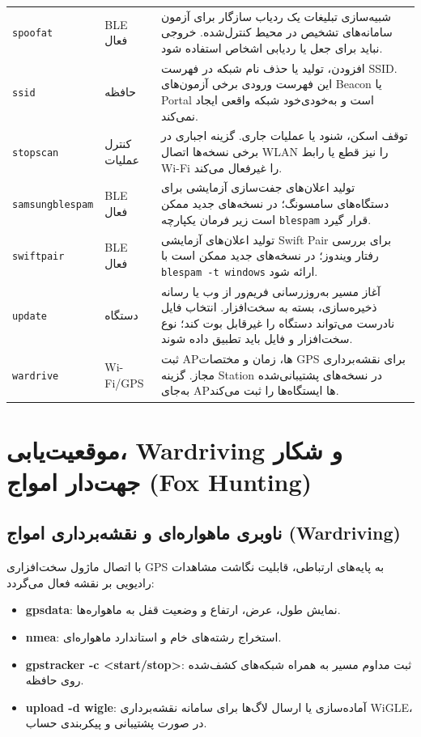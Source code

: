 \documentclass[11pt,a4paper]{article}
\newcommand{\lr}[1]{\foreignlanguage{english}{#1}}
\newcommand{\en}[1]{\lr{#1}}
\newcommand{\cmd}[1]{\lr{\nolinkurl{#1}}}
\begin{document}
\begin{longtable}{>{\raggedright\arraybackslash}p{3.4cm} >{\raggedleft\arraybackslash}p{3.2cm} >{\raggedleft\arraybackslash}p{8.7cm}}
\cmd{spoofat} & \en{BLE} فعال & شبیه‌سازی تبلیغات یک ردیاب سازگار برای آزمون سامانه‌های تشخیص در محیط کنترل‌شده. خروجی نباید برای جعل یا ردیابی اشخاص استفاده شود. \\
\cmd{ssid} & حافظه & افزودن، تولید یا حذف نام شبکه در فهرست SSID. این فهرست ورودی برخی آزمون‌های Beacon یا Portal است و به‌خودی‌خود شبکه واقعی ایجاد نمی‌کند. \\
\cmd{stopscan} & کنترل عملیات & توقف اسکن، شنود یا عملیات جاری. گزینه اجباری در برخی نسخه‌ها اتصال WLAN را نیز قطع یا رابط Wi-Fi را غیرفعال می‌کند. \\
\cmd{samsungblespam} & \en{BLE} فعال & تولید اعلان‌های جفت‌سازی آزمایشی برای دستگاه‌های سامسونگ؛ در نسخه‌های جدید ممکن است زیر فرمان یکپارچه \cmd{blespam} قرار گیرد. \\
\cmd{swiftpair} & \en{BLE} فعال & تولید اعلان‌های آزمایشی \en{Swift Pair} برای بررسی رفتار ویندوز؛ در نسخه‌های جدید ممکن است با \cmd{blespam -t windows} ارائه شود. \\
\cmd{update} & دستگاه & آغاز مسیر به‌روزرسانی فریم‌ور از وب یا رسانه ذخیره‌سازی، بسته به سخت‌افزار. انتخاب فایل نادرست می‌تواند دستگاه را غیرقابل بوت کند؛ نوع سخت‌افزار و فایل باید تطبیق داده شوند. \\
\cmd{wardrive} & \en{Wi-Fi/GPS} & ثبت APها، زمان و مختصات GPS برای نقشه‌برداری مجاز. گزینه Station در نسخه‌های پشتیبانی‌شده به‌جای APها ایستگاه‌ها را ثبت می‌کند. \\
\end{longtable}

\newpage
\section{موقعیت‌یابی، \en{Wardriving} و شکار جهت‌دار امواج \en{(Fox Hunting)}}

\subsection{ناوبری ماهواره‌ای و نقشه‌برداری امواج \en{(Wardriving)}}
با اتصال ماژول سخت‌افزاری \en{GPS} به پایه‌های ارتباطی، قابلیت نگاشت مشاهدات رادیویی بر نقشه فعال می‌گردد:
\begin{itemize}
    \item \lr{\textbf{gpsdata}:} نمایش طول، عرض، ارتفاع و وضعیت قفل به ماهواره‌ها.
    \item \lr{\textbf{nmea}:} استخراج رشته‌های خام و استاندارد ماهواره‌ای.
    \item \lr{\textbf{gpstracker -c <start/stop>}:} ثبت مداوم مسیر به همراه شبکه‌های کشف‌شده روی حافظه.
    \item \lr{\textbf{upload -d wigle}:} آماده‌سازی یا ارسال لاگ‌ها برای سامانه نقشه‌برداری \en{WiGLE}، در صورت پشتیبانی و پیکربندی حساب.
\end{itemize}
\end{document}
